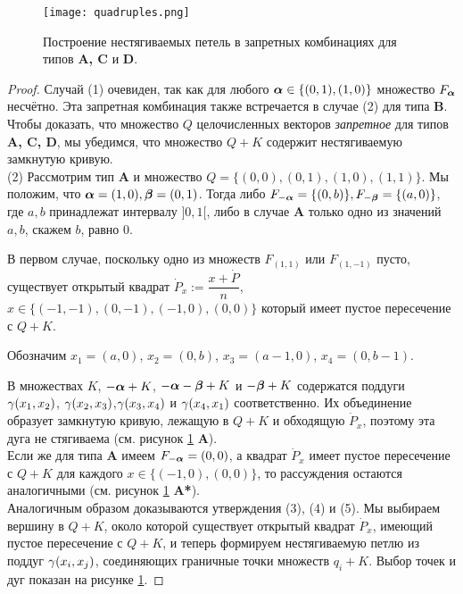 \begin{figure}[h!] 
    \centering
    \texttt{[image: quadruples.png]}
    \caption{Построение нестягиваемых петель в запретных комбинациях для типов {\bf A, C} и {\bf D}.}
    \label{forbid}
\end{figure}

\begin{proof} 

Случай (1) очевиден, так как для любого ${\bm{\alpha}}\in\{(0,1),(1,0)\}$ множество $F_{\bm{\alpha}}$ несчётно.
Эта запретная комбинация также встречается в случае (2) для типа {\bf B}.\\

Чтобы доказать, что множество $Q$ целочисленных векторов {\em запретное} для типов {\bf A, C, D}, мы убедимся, что множество $Q+K$ содержит нестягиваемую замкнутую  кривую.\\

(2)  Рассмотрим тип {\bf A} и множество $Q=\{(0,0), (0,1), (1,0), (1,1)\}$. 
Мы положим, что ${\bm{\alpha}}=(1,0), {\bm{\beta}}=(0,1)$. 
Тогда   либо $F_{-{\bm{\alpha}}}=\{(0,b)\}, F_{-{\bm{\beta}}}=\{(a,0)\}$, где $a,b$ принадлежат интервалу $]0,1[$,  либо в случае {\bf A} только одно из значений $a,b$, скажем $b$, равно $0$.

В первом случае, поскольку одно из множеств $F_{(1,1)}$ или $F_{(1,-1)}$ пусто, существует открытый квадрат $\dot P_x:=\dfrac{x+\dot P}{n}$, $x\in \{(-1,-1),(0,-1), (-1,0), (0,0)\}$ который имеет пустое пересечение с $Q+K$. 

Обозначим $x_1=(a,0)$, $x_2=(0,b)$, $x_3=(a-1,0)$, $x_4=(0,b-1)$. 

В множествах  $K$, $-{\bm{\alpha}}+K$, $-{\bm{\alpha}}-{\bm{\beta}}+K$ и $-{\bm{\beta}}+K$ содержатся поддуги  $\gamma(x_1,x_2)$, $\gamma(x_2,x_3)$,$\gamma(x_3,x_4)$ и $\gamma(x_4,x_1)$ соответственно. 
Их объединение образует замкнутую кривую, лежащую в $Q+K$ и обходящую $\dot P_x$, поэтому эта дуга не стягиваема (см. рисунок \ref{forbid} {\bf A}).\\ 

Если же для типа {\bf A} имеем $F_{-{\bm{\alpha}}}=(0,0)$, а квадрат $\dot P_x$ имеет пустое пересечение с $Q+K$ для каждого $x\in\{(-1,0), (0,0)\}$, то рассуждения остаются аналогичными (см. рисунок \ref{forbid} {\bf A*}).\\



Аналогичным образом доказываются утверждения (3), (4) и (5).
Мы выбираем вершину в $Q+K$, около которой существует открытый квадрат $\dot P_x$, имеющий пустое пересечение с $Q+K$, и теперь формируем нестягиваемую петлю из поддуг $\gamma(x_i,x_j)$, соединяющих граничные точки множеств $q_i+K$.
Выбор точек и дуг показан на рисунке \ref{forbid}.
\end{proof}


